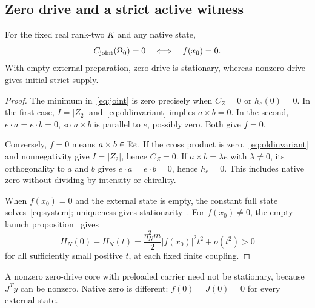 \subsection{Zero drive and a strict active witness}
\begin{proposition}\label{prop:dark}%
For the fixed real rank-two $K$ and any native state,
\begin{equation}\label{eq:zeroceiling}%
C_{\rm joint}(\Omega_0)=0\quad\Longleftrightarrow\quad f(x_0)=0.
\end{equation}
With empty external preparation, zero drive is stationary, whereas nonzero drive gives initial strict supply.
\end{proposition}
\begin{proof}
The minimum in~\eqref{eq:joint} is zero precisely when $C_Z=0$ or $h_e(0)=0$. In the first case, $I=|Z_2|$ and~\eqref{eq:oldinvariant} implies $a\times b=0$. In the second, $e\cdot a=e\cdot b=0$, so $a\times b$ is parallel to $e$, possibly zero. Both give $f=0$.

Conversely, $f=0$ means $a\times b\in\mathbb R e$. If the cross product is zero,~\eqref{eq:oldinvariant} and nonnegativity give $I=|Z_2|$, hence $C_Z=0$. If $a\times b=\lambda e$ with $\lambda\ne0$, its orthogonality to $a$ and $b$ gives $e\cdot a=e\cdot b=0$, hence $h_e=0$. This includes native zero without dividing by intensity or chirality.

When $f(x_0)=0$ and the external state is empty, the constant full state solves~\eqref{eq:system}; uniqueness gives stationarity~\cite[Section 5]{p1}. For $f(x_0)\ne0$, the empty-launch proposition~\cite[Proposition 4.1]{p1} gives
\begin{equation}\label{eq:initialdebit}%
H_N(0)-H_N(t)=\frac{\eta_N^2m}{2}|f(x_0)|^2t^2+o(t^2)>0
\end{equation}
for all sufficiently small positive $t$, at each fixed finite coupling.
\end{proof}
A nonzero zero-drive core with preloaded carrier need not be stationary, because $J^Ty$ can be nonzero. Native zero is different: $f(0)=J(0)=0$ for every external state.

